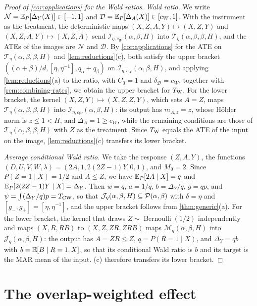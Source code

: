 \begin{proof}[Proof of \cref{cor:applications} for the Wald ratios]
\emph{Wald ratio.} We write $\mathcal N=\mathbb E_P[\Delta_Y(X)]\in[-1,1]$
and $\mathcal D=\mathbb E_P[\Delta_A(X)]\in[c_W,1]$. With the instrument as the
treatment, the deterministic maps $(X,Z,A,Y)\mapsto(X,Z,Y)$ and
$(X,Z,A,Y)\mapsto(X,Z,A)$ send $\mathcal I_{\eta,c_W}(\alpha,\beta,H)$
into $\mathcal T_\eta(\alpha,\beta,\beta,H)$, and the ATEs of the images
are $\mathcal N$ and $\mathcal D$. By \cref{cor:applications}
for the ATE on $\mathcal T_\eta(\alpha,\beta,\beta,H)$ and
\cref{lem:reductions}(c), both satisfy the upper bracket
$((\alpha+\beta)/d,[\eta,\eta^{-1}],q_\alpha+q_\beta)$ on
$\mathcal I_{\eta,c_W}(\alpha,\beta,H)$, and applying \cref{lem:reductions}(a)
to the ratio, with $C_0=1$ and $\delta_{\mathcal D}=c_W$, together with
\cref{rem:combining-rates}, we obtain the upper bracket for
$T_{\rm W}$. For the lower bracket, the kernel
$(X,Z,Y)\mapsto(X,Z,Z,Y)$, which sets $A=Z$, maps
$\mathcal T_\eta(\alpha,\beta,\beta,H)$ into
$\mathcal I_{\eta,c_W}(\alpha,\beta,H)$: its output has $m_{A,z}=z$, whose
H\"older norm is $z\le1<H$, and $\Delta_A=1\ge c_W$, while the remaining
conditions are those of $\mathcal T_\eta(\alpha,\beta,\beta,H)$ with $Z$
as the treatment. Since $T_{\rm W}$ equals the ATE of the input on the
image, \cref{lem:reductions}(c) transfers its lower bracket.

\emph{Average conditional Wald ratio.} We take the response
$(Z,A,Y)$, the functions $(D,U,V,W,\lambda)=(2A,1,2(2Z-1)Y,0,1)$, and
$M_0=2$. Since
$P(Z=1\mid X)=1/2$ and $A\le Z$, we have
$\mathbb E_P[2A\mid X]=q$ and $\mathbb E_P[2(2Z-1)Y\mid X]=\Delta_Y$. Then $w=q$,
$a=1/q$, $b=\Delta_Y/q$, $g=qp$, and $\psi=\int(\Delta_Y/q)p=T_{\rm CW}$,
so that $\mathcal J_\eta(\alpha,\beta,H)\subseteq\mathcal P(\alpha,\beta)$ with
$\delta=\eta$ and $[g_-,g_+]=[\eta,\eta^{-1}]$, and the upper bracket
follows from \cref{thm:generic}(a). For the lower
bracket, the kernel that draws $Z\sim\operatorname{Bernoulli}(1/2)$
independently and maps $(X,R,RB)$ to $(X,Z,ZR,ZRB)$ maps
$\mathcal M_\eta(\alpha,\beta,H)$ into $\mathcal J_\eta(\alpha,\beta,H)$:
the output has $A=ZR\le Z$, $q=P(R=1\mid X)$, and $\Delta_Y=qb$ with
$b=\mathbb E[B\mid R=1,X]$, so that its conditional Wald ratio is $b$ and its
target is the MAR mean of the input. (c)
therefore transfers its lower bracket.
\end{proof}

\section{The overlap-weighted effect}\label{sec:overlap-effect}

